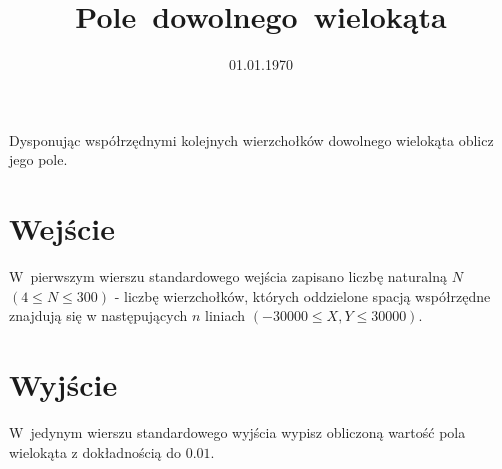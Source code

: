 \documentclass[zad]{soigstyl}
\date{01.01.1970}
\title{\mbox{Pole dowolnego wielokąta}}
\begin{document}
\begin{tasktext}%
    \noindent
    Dysponując współrzędnymi kolejnych wierzchołków dowolnego wielokąta oblicz jego pole.
	
    	\section{Wejście}
	W~pierwszym wierszu standardowego wejścia zapisano liczbę naturalną $N$
 $(4 \leqslant N \leqslant 300)$ - liczbę wierzchołków, których oddzielone spacją współrzędne znajdują się w następujących $n$ liniach $(-30000 \leqslant X, Y \leqslant 30000)$. 

	\section{Wyjście}
	W~jedynym wierszu standardowego wyjścia wypisz obliczoną wartość pola wielokąta z dokładnością do $0.01$.
	
	\oigprzyklady
\end{tasktext}
\end{document}
